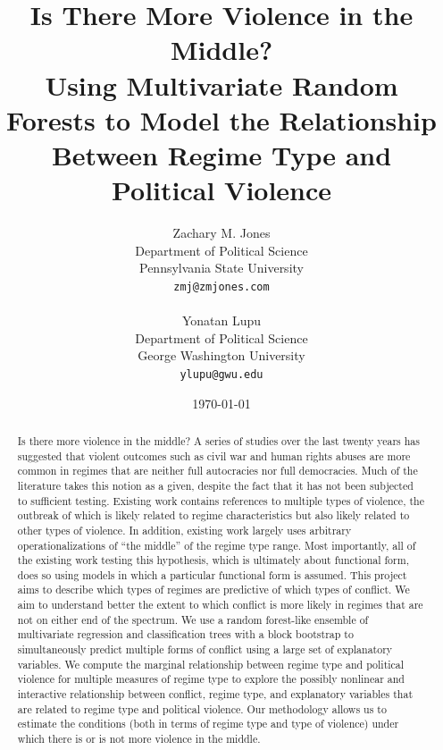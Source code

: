 \documentclass[titlepage, onecolumn,12pt]{article}
\begin{document}
\begin{titlepage}
\title{Is There More Violence in the Middle?\\
Using Multivariate Random Forests to Model the Relationship Between Regime Type and Political Violence\let\thefootnote\relax{}}
\author{Zachary M. Jones\\
Department of Political Science\\
Pennsylvania State University\\
\texttt{zmj@zmjones.com}\\
\\
Yonatan Lupu\\
Department of Political Science\\
George Washington University\\
\texttt{ylupu@gwu.edu}\\}
\date{\today}
\maketitle
\end{titlepage}
\begin{abstract}
Is there more violence in the middle?  A series of studies over the last twenty years has suggested that violent outcomes such as civil war and human rights abuses are more common in regimes that are neither full autocracies nor full democracies. Much of the literature takes this notion as a given, despite the fact that it has not been subjected to sufficient testing.  Existing work contains references to multiple types of violence, the outbreak of which is likely related to regime characteristics but also likely related to other types of violence.  In addition, existing work largely uses arbitrary operationalizations of ``the middle'' of the regime type range.  Most importantly, all of the existing work testing this hypothesis, which is ultimately about functional form, does so using models in which a particular functional form is assumed.  This project aims to describe which types of regimes are predictive of which types of conflict.  We aim to understand better the extent to which conflict is more likely in regimes that are not on either end of the spectrum.  We use a random forest-like ensemble of multivariate regression and classification trees with a block bootstrap to simultaneously predict multiple forms of conflict using a large set of explanatory variables. We compute the marginal relationship between regime type and political violence for multiple measures of regime type to explore the possibly nonlinear and interactive relationship between conflict, regime type, and explanatory variables that are related to regime type and political violence. Our methodology allows us to estimate the conditions (both in terms of regime type and type of violence) under which there is or is not more violence in the middle.
 \end{abstract}
\end{document}
